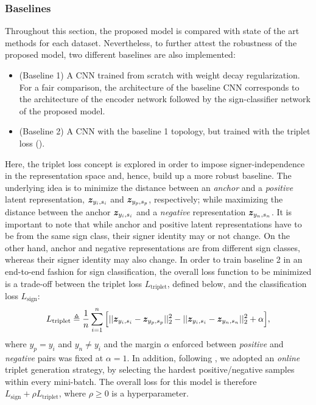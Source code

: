 \subsubsection{Baselines}
Throughout this section, the proposed model is compared with state of the art methods for each dataset. Nevertheless, to further attest the robustness of the proposed model, two different baselines are also implemented:
\begin{itemize}
    \item (Baseline 1) A CNN trained from scratch with weight decay regularization. For a fair comparison, the architecture of the baseline CNN corresponds to the architecture of the encoder network followed by the sign-classifier network of the proposed model.
    \item (Baseline 2) A CNN with the baseline 1 topology, but trained with the triplet loss (\citet{Schroff2015}).
\end{itemize}
Here, the triplet loss concept is explored in order to impose signer-independence in the representation space and, hence, build up a more robust baseline. The underlying idea is to minimize the distance between an \textit{anchor} and a \textit{positive} latent representation, ${\bm{z}}_{y_{i}, s_{i}}$ and ${\bm{z}}_{y_{p}, s_{p}}$, respectively; while maximizing the distance between the anchor ${\bm{z}}_{y_{i}, s_{i}}$ and a \textit{negative} representation ${\bm{z}}_{y_{n}, s_{n}}$. It is important to note that while anchor and positive latent representations have to be from the same sign class, their signer identity may or not change. On the other hand, anchor and negative representations are from different sign classes, whereas their signer identity may also change. In order to train baseline 2 in an end-to-end fashion for sign classification, the overall loss function to be minimized is a trade-off between the triplet loss $L_{\text{triplet}}$, defined below, and the classification loss $L_{\text{sign}}$:
\begin{equation}
    L_{\text{triplet}} \triangleq \frac{1}{n}\sum_{i=1}^{n}\Big[||{\bm{z}}_{y_{i}, s_{i}}-{\bm{z}}_{y_{p}, s_{p}}||^2_2 - ||{\bm{z}}_{y_{i}, s_{i}}-{\bm{z}}_{y_{n}, s_{n}}||^2_2 + \alpha\Big],
\end{equation}
where $y_{p}=y_{i}$ and $y_{n} \neq y_{i}$ and the margin $\alpha$ enforced between \emph{positive} and \emph{negative} pairs was fixed at $\alpha=1$. In addition, following \citet{Schroff2015}, we adopted an \emph{online} triplet generation strategy, by selecting the hardest positive/negative samples within every mini-batch. The overall loss for this model is therefore $L_{\text{sign}} + \rho L_{\text{triplet}}$, where $\rho \geq 0$ is a hyperparameter.


